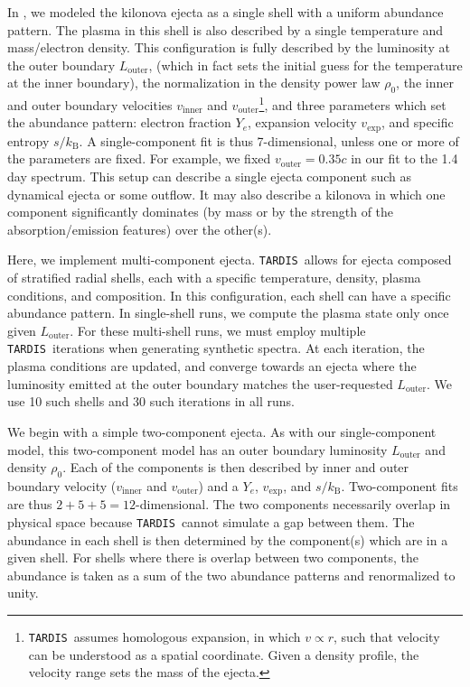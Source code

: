 \documentclass[twocolumn,twocolappendix]{aastex63}
\def\TARDIS{\texttt{TARDIS}}
\def\V23{\citetalias{vieira23}}
\begin{document}
In \V23, we modeled the kilonova ejecta as a single shell with a uniform abundance pattern. The plasma in this shell is also described by a single temperature and mass/electron density. This configuration is fully described by the luminosity at the outer boundary $L_{\mathrm{outer}}$, (which in fact sets the initial guess for the temperature at the inner boundary), the normalization in the density power law $\rho_0$, the inner and outer boundary velocities $v_{\mathrm{inner}}$ and $v_{\mathrm{outer}}$\footnote{\TARDIS~assumes homologous expansion, in which $v \propto r$, such that velocity can be understood as a spatial coordinate. Given 
a density profile, the velocity range sets the mass of the ejecta.}, and three parameters which set the abundance pattern: electron fraction $Y_e$, expansion velocity $v_{\mathrm{exp}}$, and specific entropy $s / k_{\mathrm{B}}$. A single-component fit is thus 7-dimensional, unless one or more of the parameters are fixed. For example, we fixed $v_{\mathrm{outer}} = 0.35c$ in our fit to the 1.4 day spectrum. This setup can describe a single ejecta component such as dynamical ejecta or some outflow. It may also describe a kilonova in which one component significantly dominates (by mass or by the strength of the absorption/emission features) over the other(s). 
    
Here, we implement multi-component ejecta. \TARDIS~allows for ejecta composed of stratified radial shells, each with a specific temperature, density, plasma conditions, and composition. In this configuration, each shell can have a specific abundance pattern. In single-shell runs, we compute the plasma state only once given $L_{\mathrm{outer}}$. For these multi-shell runs, we must employ multiple \TARDIS~iterations when generating synthetic spectra. At each iteration, the plasma conditions are updated, and converge towards an ejecta where the luminosity emitted at the outer boundary matches the user-requested $L_{\mathrm{outer}}$. We use 10 such shells and 30 such iterations in all runs.
    
We begin with a simple two-component ejecta. As with our single-component model, this two-component model has an outer boundary luminosity $L_{\mathrm{outer}}$ and density $\rho_0$. Each of the components is then described by inner and outer boundary velocity ($v_{\mathrm{inner}}$ and $v_{\mathrm{outer}}$) and a $Y_e$, $v_{\mathrm{exp}}$, and $s / k_{\mathrm{B}}$. Two-component fits are thus $2 + 5 + 5 = 12$-dimensional. The two components necessarily overlap in physical space because \TARDIS~cannot simulate a gap between them. The abundance in each shell is then determined by the component(s) which are in a given shell. For shells where there is overlap between two components, the abundance is taken as a sum of the two abundance patterns and renormalized to unity. 
\end{document}
